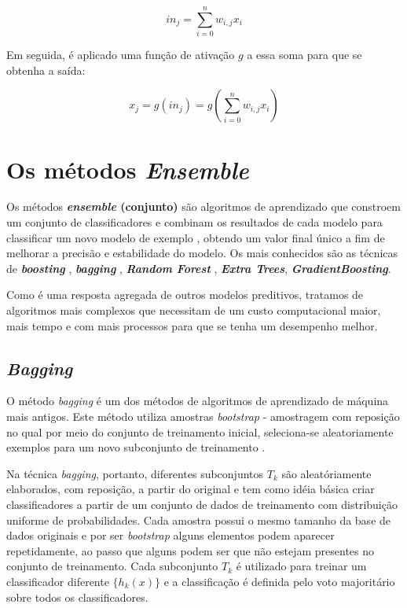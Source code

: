 \documentclass[
  openany]{book}
\begin{document}
\begin{equation} 
  in_j=\displaystyle \sum^n_{i=0} w_{i,j}x_i
  \label{eq:reglinrede}
\end{equation}

Em seguida, é aplicado uma função de ativação \(g\) a essa soma para que se obtenha a saída:

\begin{equation} 
  x_j=g(in_j)=g(\displaystyle \sum^n_{i=0}w_{i,j}x_i)
  \label{eq:reglinrede}
\end{equation}

\hypertarget{ptIII}{%
\chapter{\texorpdfstring{Os métodos \emph{Ensemble}}{Os métodos Ensemble}}\label{ptIII}}

Os métodos \textbf{\emph{ensemble} (conjunto)} são algoritmos de aprendizado que constroem um conjunto de classificadores e combinam os resultados de cada modelo para classificar um novo modelo de exemplo \citep{dietterich2000ensemble}, obtendo um valor final único a fim de melhorar a precisão e estabilidade do modelo. Os mais conhecidos são as técnicas de \textbf{\emph{boosting}} \citep{freund1996experiments}, \textbf{\emph{bagging}} \citep{breiman1996bagging}, \textbf{\emph{Random Forest}} \citep{breiman2001random, liaw2002classification}, \textbf{\emph{Extra Trees}}, \textbf{\emph{GradientBoosting}}.

Como é uma resposta agregada de outros modelos preditivos, tratamos de algoritmos mais complexos que necessitam de um custo computacional maior, mais tempo e com mais processos para que se tenha um desempenho melhor.

\hypertarget{bagging}{%
\section{\texorpdfstring{\emph{Bagging}}{Bagging}}\label{bagging}}

O método \emph{bagging} \citep{breiman1996bagging} é um dos métodos de algoritmos de aprendizado de máquina mais antigos. Este método utiliza amostras \emph{bootstrap} - amostragem com reposição no qual por meio do conjunto de treinamento inicial, seleciona-se aleatoriamente exemplos para um novo subconjunto de treinamento \citep{oshiro2013abordagem}.

Na técnica \emph{bagging}, portanto, diferentes subconjuntos \(T_k\) são aleatóriamente elaborados, com reposição, a partir do original e tem como idéia básica criar classificadores a partir de um conjunto de dados de treinamento com distribuição uniforme de probabilidades. Cada amostra possui o mesmo tamanho da base de dados originais e por ser \emph{bootstrap} alguns elementos podem aparecer repetidamente, ao passo que alguns podem ser que não estejam presentes no conjunto de treinamento. Cada subconjunto \(T_k\) é utilizado para treinar um classificador diferente \(\{h_k(x)\}\) e a classificação é definida pelo voto majoritário sobre todos os classificadores.
\end{document}
